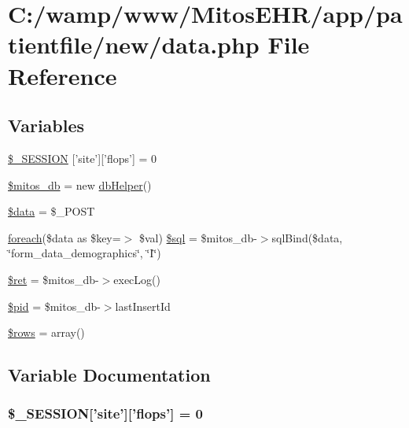 \hypertarget{patientfile_2new_2data_8php}{\section{\-C\-:/wamp/www/\-Mitos\-E\-H\-R/app/patientfile/new/data.php \-File \-Reference}
\label{patientfile_2new_2data_8php}
}
\subsection*{\-Variables}
\begin{DoxyCompactItemize}
\item 
\hyperlink{patientfile_2new_2data_8php_a99fda8552a3e58235643b79f5af3ded8}{\$\-\_\-\-S\-E\-S\-S\-I\-O\-N} \mbox{[}'site'\mbox{]}\mbox{[}'flops'\mbox{]} = 0
\item 
\hyperlink{patientfile_2new_2data_8php_ab5d961f93efe4e2e8d8374f01dd6c65a}{\$mitos\-\_\-db} = new \hyperlink{classdb_helper}{db\-Helper}()
\item 
\hyperlink{patientfile_2new_2data_8php_a6efc15b5a2314dd4b5aaa556a375c6d6}{\$data} = \$\-\_\-\-P\-O\-S\-T
\item 
\hyperlink{php_thumb_8demo_8demo_8php_a9caa026f841c5a6057418795d37e0ef9}{foreach}(\$data as \$key=$>$ \$val) \hyperlink{patientfile_2new_2data_8php_ac002a22b17adea1f24adf8019e0ea6e9}{\$sql} = \$mitos\-\_\-db-\/$>$sql\-Bind(\$data, \char`\"{}form\-\_\-data\-\_\-demographics\char`\"{}, \char`\"{}\-I\char`\"{})
\item 
\hyperlink{patientfile_2new_2data_8php_affd9e3eb0aad0a7ca42912cd925f148c}{\$ret} = \$mitos\-\_\-db-\/$>$exec\-Log()
\item 
\hyperlink{patientfile_2new_2data_8php_a9b726f748a2135350f7d86668cc058ee}{\$pid} = \$mitos\-\_\-db-\/$>$last\-Insert\-Id
\item 
\hyperlink{patientfile_2new_2data_8php_ace2ec39e7df3899fa8df9640ec274b03}{\$rows} = array()
\end{DoxyCompactItemize}


\subsection{\-Variable \-Documentation}
\hypertarget{patientfile_2new_2data_8php_a99fda8552a3e58235643b79f5af3ded8}{
\subsubsection[{\$\-\_\-\-S\-E\-S\-S\-I\-O\-N}]{\setlength{\rightskip}{0pt plus 5cm}\$\-\_\-\-S\-E\-S\-S\-I\-O\-N\mbox{[}'site'\mbox{]}\mbox{[}'flops'\mbox{]} = 0}}\label{patientfile_2new_2data_8php_a99fda8552a3e58235643b79f5af3ded8}


